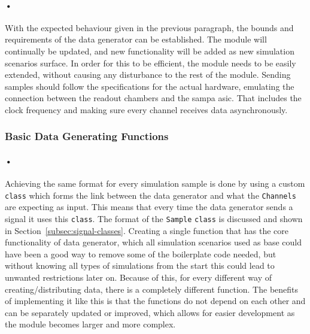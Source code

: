 \documentclass[a4paper, 12pt, openright, twoside]{report}
\newcommand{\codeword}[1]{\texttt{#1}}
\begin{document}
\paragraph{•}
With the expected behaviour given in the previous paragraph, the bounds and requirements of the data generator can be established.
The module will continually be updated, and new functionality will be added as new simulation scenarios surface. 
In order for this to be efficient, the module needs to be easily extended, without causing any disturbance to the rest of the module.
Sending samples should follow the specifications for the actual hardware, emulating the connection between the readout chambers and the \gls{sampa} \gls{asic}.
That includes the clock frequency and making sure every channel receives data asynchronously.

\subsubsection{Basic Data Generating Functions}

\paragraph{•}
Achieving the same format for every simulation sample is done by using a custom \codeword{class} which forms the link between the data generator and what the \codeword{Channels} are expecting as input.
This means that every time the data generator sends a signal it uses this \codeword{class}.
The format of the \codeword{Sample} \codeword{class} is discussed and shown in Section~\ref{subsec:signal-classes}.
Creating a single function that has the core functionality of data generator, which all simulation scenarios used as base could have been a good way to remove some of the boilerplate code needed, but without knowing all types of simulations from the start this could lead to unwanted restrictions later on.
Because of this, for every different way of creating/distributing data, there is a completely different function.
The benefits of implementing it like this is that the functions do not depend on each other and can be separately updated or improved, which allows for easier development as the module becomes larger and more complex.
\end{document}
